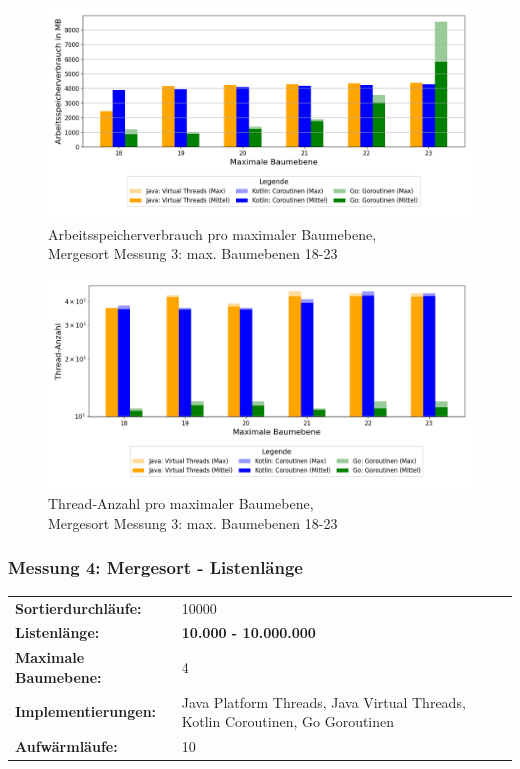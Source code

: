 \documentclass[fontsize=12pt,paper=a4,twoside=semi,parskip=half-,headsepline,headinclude]{scrreprt}
\begin{document}
\begin{figure}[H]
	\centering
	\includegraphics[scale=0.5]{figures/mergesort/Maximalebauebenen1-23_vcg/memory_usage_bar_plot.png}
	\caption{Arbeitsspeicherverbrauch pro maximaler Baumebene,\\ Mergesort Messung 3: max. Baumebenen 18-23}
	\label{fig:ms1-23RAM}
\end{figure}

\begin{figure}[H]
	\centering
	\includegraphics[scale=0.5]{figures/mergesort/Maximalebauebenen1-23_vcg/num_threads_bar_plot.png}
	\caption{Thread-Anzahl pro maximaler Baumebene,\\ Mergesort Messung 3: max. Baumebenen 18-23}
	\label{fig:ms1-23Threads}
\end{figure}


\subsubsection{Messung 4: Mergesort - Listenlänge}

\begin{tabularx}{\textwidth}{@{}lX@{}}
	\textbf{Sortierdurchläufe:} & 10000 \\
	\textbf{Listenlänge:} & \textbf{10.000 - 10.000.000} \\
	\textbf{Maximale Baumebene:} & 4 \\
	\textbf{Implementierungen:} & Java Platform Threads, Java Virtual Threads, Kotlin Coroutinen, Go Goroutinen \\
	\textbf{Aufwärmläufe:} & 10
\end{tabularx}
\end{document}
